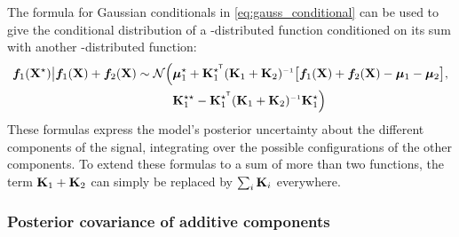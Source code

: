 The formula for Gaussian conditionals in \cref{eq:gauss_conditional} can be used to give the conditional distribution of a \gp{}-distributed function conditioned on its sum with another \gp{}-distributed function:
%
\begin{align}
\vf_1(\vX^\star) \big| \vf_1(\vX) + \vf_2(\vX) \sim \Normal \Big( 
& \vmu_1^\star + \vK_1^{\star\tra} (\vK_1 + \vK_2)\inv \big[ \vf_1(\vX) + \vf_2(\vX) - \vmu_1 - \vmu_2 \big], \nonumber \\
& \vK_1^{\star\star} - \vK_1^{\star\tra} (\vK_1 + \vK_2)\inv \vK_1^{\star} \Big)
\end{align}
%
These formulas express the model's posterior uncertainty about the different components of the signal, integrating over the possible configurations of the other components.
To extend these formulas to a sum of more than two functions, the term $\mathbf{K}_1 + \mathbf{K}_2$ can simply be replaced by $\sum_i \mathbf{K}_i$ everywhere.




\subsubsection{Posterior covariance of additive components}

